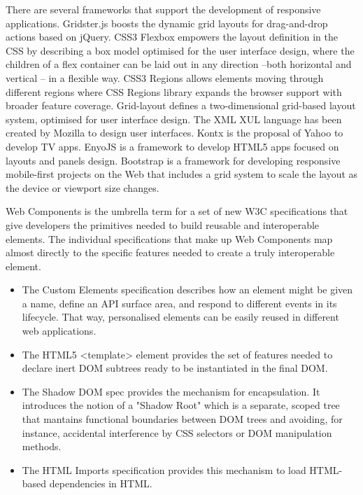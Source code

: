 There are several frameworks that support the development of responsive applications. Gridster.js \cite{gridster}  boosts the dynamic grid layouts for drag-and-drop actions based on jQuery. CSS3 Flexbox \cite{W3C2014FB} empowers the layout definition in the CSS by describing a box model optimised for the user interface design, where the children of a flex container can be laid out in any direction –both horizontal and vertical – in a flexible way. CSS3 Regions \cite{W3C2014Reg} allows elements moving through different regions where CSS Regions library \cite{cssreg} expands the browser support with broader feature coverage. Grid-layout \cite{W3C2014GL} defines a two-dimensional grid-based layout system, optimised for user interface design. The XML XUL\cite{mozxul} language has been created by Mozilla to design user interfaces. Kontx \cite{kontx} is the proposal of Yahoo to develop TV apps. EnyoJS \cite{enyo} is a framework to develop HTML5 apps focused on layouts and panels design. Bootstrap \cite{bootstrap} is a framework for developing responsive mobile-first projects on the Web that includes a grid system to scale the layout as the device or viewport size changes.

Web Components \cite{webcomps} is the umbrella term for a set of new W3C specifications that give developers the primitives needed to build reusable and interoperable elements. The individual specifications that make up Web Components map almost directly to the specific features needed to create a truly interoperable element.
\begin{itemize}
	\item The Custom Elements specification \cite{customelements} describes how an element might be given a name, define an API surface area, and respond to different events in its lifecycle. That way, personalised elements can be easily reused in different web applications.
	\item The HTML5 <template> element \cite{htmltemplate} provides the set of features needed to declare inert DOM subtrees ready to be instantiated in the final DOM.
	\item The Shadow DOM spec \cite{shadowdom} provides the mechanism for encapsulation. It introduces the notion of a "Shadow Root" which is a separate, scoped tree that mantains functional boundaries between DOM trees and avoiding, for instance, accidental interference by CSS selectors or DOM manipulation methods.
	\item The HTML Imports specification \cite{htmlimports} provides this mechanism to load HTML-based dependencies in HTML.
	
\end{itemize}

